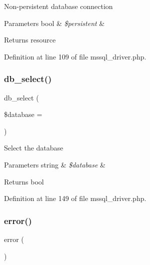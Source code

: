 Non-\/persistent database connection


\begin{DoxyParams}[1]{Parameters}
bool & {\em \$persistent} & \\
\hline
\end{DoxyParams}
\begin{DoxyReturn}{Returns}
resource 
\end{DoxyReturn}


Definition at line 109 of file mssql\+\_\+driver.\+php.

\mbox{\label{class_c_i___d_b__mssql__driver_a18ae9c21870b30b45337c5e3626190cc}} 
\subsubsection{\texorpdfstring{db\_select()}{db\_select()}}
{\footnotesize\ttfamily db\+\_\+select (\begin{DoxyParamCaption}\item[{}]{\$database = {\ttfamily \textquotesingle{}\textquotesingle{}} }\end{DoxyParamCaption})}

Select the database


\begin{DoxyParams}[1]{Parameters}
string & {\em \$database} & \\
\hline
\end{DoxyParams}
\begin{DoxyReturn}{Returns}
bool 
\end{DoxyReturn}


Definition at line 149 of file mssql\+\_\+driver.\+php.

\mbox{\label{class_c_i___d_b__mssql__driver_a43b8d30b879d4f09ceb059b02af2bc02}} 
\subsubsection{\texorpdfstring{error()}{error()}}
{\footnotesize\ttfamily error (\begin{DoxyParamCaption}{ }\end{DoxyParamCaption})}

